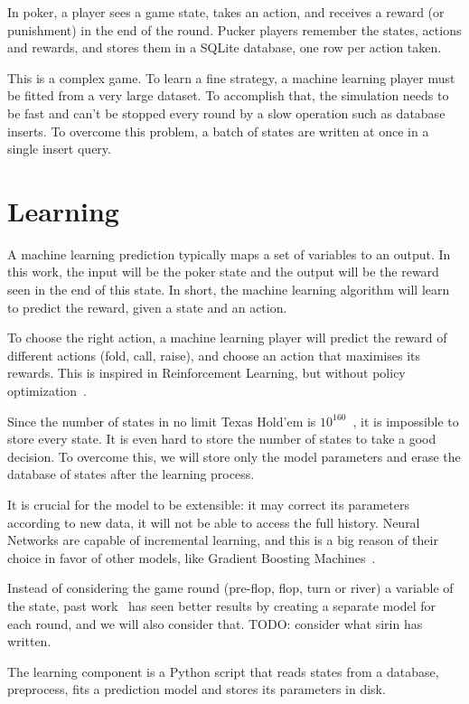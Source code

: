 In poker, a player sees a game state, takes an action, and receives a reward (or punishment) in the end of the round. Pucker players remember the states, actions and rewards, and stores them in a SQLite database, one row per action taken.

This is a complex game. To learn a fine strategy, a machine learning player must be fitted from a very large dataset. To accomplish that, the simulation needs to be fast and can't be stopped every round by a slow operation such as database inserts. To overcome this problem, a batch of states are written at once in a single insert query.

\section{Learning}
\label{sec:Learning}

A machine learning prediction typically maps a set of variables to an output. In this work, the input will be the poker state and the output will be the reward seen in the end of this state. In short, the machine learning algorithm will learn to predict the reward, given a state and an action.

To choose the right action, a machine learning player will predict the reward of different actions (fold, call, raise), and choose an action that maximises its rewards. This is inspired in Reinforcement Learning, but without policy optimization~\cite{Silver2016}.

Since the number of states in no limit Texas Hold’em is $10^{160}$~\cite{Johanson2013}, it is impossible to store every state. It is even hard to store the number of states to take a good decision. To overcome this, we will store only the model parameters and erase the database of states after the learning process.

It is crucial for the model to be extensible: it may correct its parameters according to new data, it will not be able to access the full history. Neural Networks are capable of incremental learning, and this is a big reason of their choice in favor of other models, like Gradient Boosting Machines~\cite{something}.

Instead of considering the game round (pre-flop, flop, turn or river) a variable of the state, past work~\cite{Sirin2008} has seen better results by creating a separate model for each round, and we will also consider that. TODO: consider what sirin has written.

The learning component is a Python script that reads states from a database, preprocess, fits a prediction model and stores its parameters in disk.

